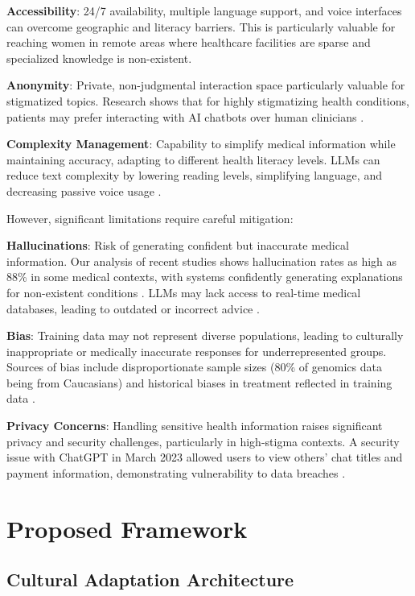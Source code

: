 \documentclass[letterpaper]{article} %
\begin{document}
\textbf{Accessibility}: 24/7 availability, multiple language support, and voice interfaces can overcome geographic and literacy barriers. This is particularly valuable for reaching women in remote areas where healthcare facilities are sparse and specialized knowledge is non-existent.

\textbf{Anonymity}: Private, non-judgmental interaction space particularly valuable for stigmatized topics. Research shows that for highly stigmatizing health conditions, patients may prefer interacting with AI chatbots over human clinicians \cite{digitalhealth2021sensitive}.

\textbf{Complexity Management}: Capability to simplify medical information while maintaining accuracy, adapting to different health literacy levels. LLMs can reduce text complexity by lowering reading levels, simplifying language, and decreasing passive voice usage \cite{pmc2024healthliteracy}.

However, significant limitations require careful mitigation:

\textbf{Hallucinations}: Risk of generating confident but inaccurate medical information. Our analysis of recent studies shows hallucination rates as high as 88\% in some medical contexts, with systems confidently generating explanations for non-existent conditions \cite{newsweek2025warning}. LLMs may lack access to real-time medical databases, leading to outdated or incorrect advice \cite{mountsinai2025misinformation}.

\textbf{Bias}: Training data may not represent diverse populations, leading to culturally inappropriate or medically inaccurate responses for underrepresented groups. Sources of bias include disproportionate sample sizes (80\% of genomics data being from Caucasians) and historical biases in treatment reflected in training data \cite{cdc2024bias}.

\textbf{Privacy Concerns}: Handling sensitive health information raises significant privacy and security challenges, particularly in high-stigma contexts. A security issue with ChatGPT in March 2023 allowed users to view others' chat titles and payment information, demonstrating vulnerability to data breaches \cite{simboai2024privacy}.

\section{Proposed Framework}

\subsection{Cultural Adaptation Architecture}
\end{document}
